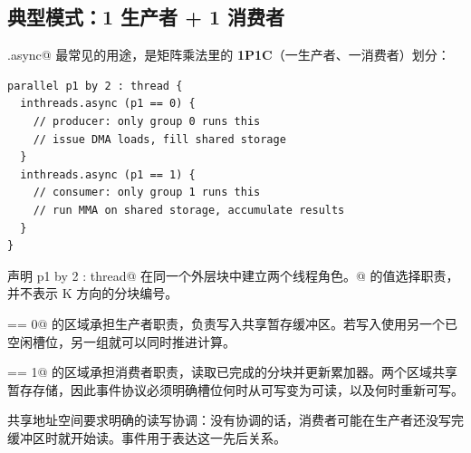 \subsection*{典型模式：1 生产者 + 1 消费者}

\co@inthreads.async@ 最常见的用途，是矩阵乘法里的 \textbf{1P1C}（一生产者、一消费者）划分：

\begin{lstlisting}[language=croqtile,caption={典型模式：1 生产者 1 消费者}]
parallel p1 by 2 : thread {
  inthreads.async (p1 == 0) {
    // producer: only group 0 runs this
    // issue DMA loads, fill shared storage
  }
  inthreads.async (p1 == 1) {
    // consumer: only group 1 runs this
    // run MMA on shared storage, accumulate results
  }
}
\end{lstlisting}

声明 \co@parallel p1 by 2 : thread@ 在同一个外层块中建立两个线程角色。@ 的值选择职责，并不表示 K 方向的分块编号。

 == 0@ 的区域承担生产者职责，负责写入共享暂存缓冲区。若写入使用另一个已空闲槽位，另一组就可以同时推进计算。

 == 1@ 的区域承担消费者职责，读取已完成的分块并更新累加器。两个区域共享暂存存储，因此事件协议必须明确槽位何时从可写变为可读，以及何时重新可写。

共享地址空间要求明确的读写协调：没有协调的话，消费者可能在生产者还没写完缓冲区时就开始读。事件用于表达这一先后关系。
